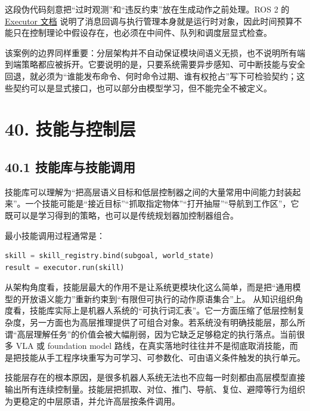 这段伪代码刻意把“过时观测”和“违反约束”放在生成动作之前处理。ROS 2 的 \href{https://docs.ros.org/en/ros2_documentation/rolling/Concepts/Intermediate/About-Executors.html}{Executor 文档} 说明了消息回调与执行管理本身就是运行时对象，因此时间预算不能只在控制理论中假设存在，也必须在中间件、队列和调度层显式检查。

该案例的边界同样重要：分层架构并不自动保证模块间语义无损，也不说明所有端到端策略都应被拆开。它要说明的是，只要系统需要异步感知、可中断技能与安全回退，就必须为“谁能发布命令、何时命令过期、谁有权抢占”写下可检验契约；这些契约可以是显式接口，也可以部分由模型学习，但不能完全不被定义。

\chapter*{40. 技能与控制层}

\section*{40.1 技能库与技能调用}


技能库可以理解为“把高层语义目标和低层控制器之间的大量常用中间能力封装起来”。一个技能可能是“接近目标”“抓取指定物体”“打开抽屉”“导航到工作区”，它既可以是学习得到的策略，也可以是传统规划器加控制器组合。

最小技能调用过程通常是：

\begin{lstlisting}[language=python]
skill = skill_registry.bind(subgoal, world_state)
result = executor.run(skill)
\end{lstlisting}

从架构角度看，技能层最大的作用不是让系统更模块化这么简单，而是把“通用模型的开放语义能力”重新约束到“有限但可执行的动作原语集合”上。 从知识组织角度看，技能库实际上是机器人系统的“可执行词汇表”。它一方面压缩了低层控制复杂度，另一方面也为高层推理提供了可组合对象。若系统没有明确技能层，那么所谓“高层理解任务”的价值会被大幅削弱，因为它缺乏足够稳定的执行落点。当前很多 VLA 或 foundation model 路线，在真实落地时往往并不是彻底取消技能，而是把技能从手工程序块重写为可学习、可参数化、可由语义条件触发的执行单元。

技能层存在的根本原因，是很多机器人系统无法也不应每一时刻都由高层模型直接输出所有连续控制量。技能层把抓取、对位、推门、导航、复位、避障等行为组织为更稳定的中层原语，并允许高层按条件调用。

